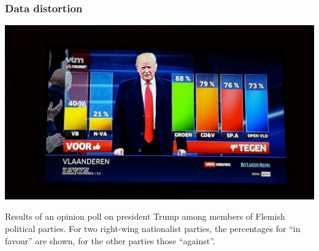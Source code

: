 \documentclass{beamer}
\begin{document}
\begin{frame}
  \frametitle{Data distortion}

  \begin{center}
    \includegraphics[width=.8\textwidth]{img/les2-03-2}

    \small
    Results of an opinion poll on president Trump among members of Flemish political parties. For two right-wing nationalist parties, the percentages for ``in favour'' are shown, for the other parties those ``against''.
  \end{center}
\end{frame}
\end{document}
